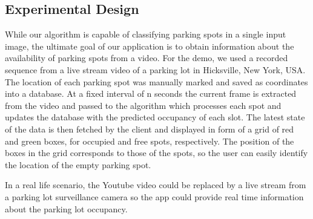 \documentclass[12pt]{article}
\begin{document}
\subsection{Experimental Design}
While our algorithm is capable of classifying parking spots in a single input image, the ultimate goal of our application is to obtain information about the availability of parking spots from a video. 
For the demo, we used a recorded sequence from a live stream video of a parking lot in Hicksville, New York, USA. The location of each parking spot was manually marked and saved as coordinates into a database. 
At a fixed interval of n seconds the current frame is extracted from the video and passed to the algorithm which processes each spot and updates the database with the predicted occupancy of each slot.
The latest state of the data is then fetched by the client and displayed in form of a grid of red and green boxes, for occupied and free spots, respectively. 
The position of the boxes in the grid corresponds to those of the spots, so the user can easily identify the location of the empty parking spot.

In a real life scenario, the Youtube video could be replaced by a live stream from a parking lot surveillance camera so the app could provide real time information about the parking lot occupancy.

\clearpage


\end{document}

